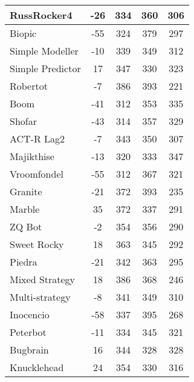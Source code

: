 \begin{table}
\begin{tabular}{|l|c|c|c|c|}
RussRocker4 & -26 & 334 & 360 & 306 \\ \hline 
Biopic & -55 & 324 & 379 & 297 \\ \hline 
Simple Modeller & -10 & 339 & 349 & 312 \\ \hline 
Simple Predictor & 17 & 347 & 330 & 323 \\ \hline 
Robertot & -7 & 386 & 393 & 221 \\ \hline 
Boom & -41 & 312 & 353 & 335 \\ \hline 
Shofar & -43 & 314 & 357 & 329 \\ \hline 
ACT-R Lag2 & -7 & 343 & 350 & 307 \\ \hline 
Majikthise & -13 & 320 & 333 & 347 \\ \hline 
Vroomfondel & -55 & 312 & 367 & 321 \\ \hline 
Granite & -21 & 372 & 393 & 235 \\ \hline 
Marble & 35 & 372 & 337 & 291 \\ \hline 
ZQ Bot & -2 & 354 & 356 & 290 \\ \hline 
Sweet Rocky & 18 & 363 & 345 & 292 \\ \hline 
Piedra & -21 & 342 & 363 & 295 \\ \hline 
Mixed Strategy & 18 & 386 & 368 & 246 \\ \hline 
Multi-strategy & -8 & 341 & 349 & 310 \\ \hline 
Inocencio & -58 & 337 & 395 & 268 \\ \hline 
Peterbot & -11 & 334 & 345 & 321 \\ \hline 
Bugbrain & 16 & 344 & 328 & 328 \\ \hline 
Knucklehead & 24 & 354 & 330 & 316 \\ \hline
        \end{tabular}
    \end{table}